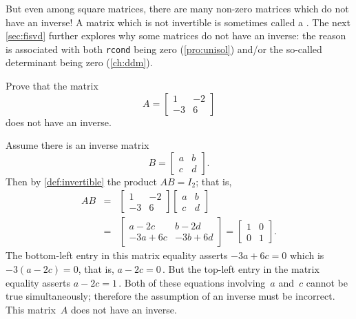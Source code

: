 But even among square matrices, there are many non-zero matrices which do not have an inverse!
A matrix which is not invertible is sometimes called a .
The next \autoref{sec:fisvd} further explores why some matrices do not have an inverse: the reason is associated with both \verb|rcond| being zero (\autoref{pro:unisol}) and/or the so-called determinant being zero (\autoref{ch:ddm}).

\begin{example}[no inverse] \label{eg:no2x2inv}
Prove that the matrix
\begin{equation*}
A=\begin{bmatrix} 1&-2\\-3&6 \end{bmatrix}
\end{equation*}
does not have an inverse.
\begin{solution} 
Assume there is an inverse matrix
\begin{equation*}
B=\begin{bmatrix} a&b\\c&d \end{bmatrix}.
\end{equation*}
Then by \autoref{def:invertible} the product \(AB=I_2\); that is,
\begin{eqnarray*}
AB&=&\begin{bmatrix} 1&-2\\-3&6 \end{bmatrix}
\begin{bmatrix} a&b\\c&d \end{bmatrix}
\\&=&\begin{bmatrix} a-2c&b-2d\\-3a+6c&-3b+6d \end{bmatrix}
=\begin{bmatrix} 1&0\\0&1 \end{bmatrix}.
\end{eqnarray*}
The bottom-left entry in this matrix equality asserts \(-3a+6c=0\) which is \(-3(a-2c)=0\), that is, \(a-2c=0\)\,.
But the top-left entry in the matrix equality asserts \(a-2c=1\)\,.
Both of these equations involving~\(a\) and~\(c\) cannot be true simultaneously; therefore the assumption of an inverse must be incorrect.
This matrix~\(A\) does not have an inverse.
\end{solution}
\end{example}



